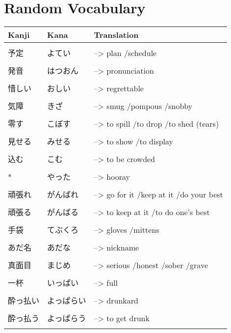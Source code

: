 \documentclass{article}
\begin{document}
\part*{Random Vocabulary}
\begin{tabular}{ l | l l }
Kanji&Kana&Translation\\ \hline\\[-1em]
予定				& よてい					&--> plan /schedule 						\\ \hline\\[-1em]
発音				& はつおん					&--> pronunciation 							\\ \hline\\[-1em]
惜しい			& おしい					&--> regrettable 							\\ \hline\\[-1em]
気障				& きざ 					&--> smug /pompous /snobby					\\ \hline\\[-1em]
零す				& こぼす					&--> to spill /to drop /to shed (tears)		\\ \hline\\[-1em]
見せる			& みせる					&--> to show /to display					\\ \hline\\[-1em]
込む				& こむ					&--> to be crowded							\\ \hline\\[-1em]
*				& やった					&--> hooray									\\ \hline\\[-1em]
頑張れ			& がんばれ					&--> go for it /keep at it /do your best	\\ \hline\\[-1em]
頑張る			& がんばる 				&--> to keep at it /to do one's best		\\ \hline\\[-1em]
手袋				& てぶくろ					&--> gloves /mittens						\\ \hline\\[-1em]
あだ名			& あだな					&--> nickname								\\ \hline\\[-1em]
真面目			& まじめ					&--> serious /honest /sober /grave			\\ \hline\\[-1em]
一杯				& いっぱい					&--> full									\\ \hline\\[-1em]
酔っ払い			& よっぱらい				&--> drunkard								\\ \hline\\[-1em]
酔っ払う			& よっぱらう					&--> to get drunk							\\ \hline\\[-1em]
\end{tabular}
\end{document}
